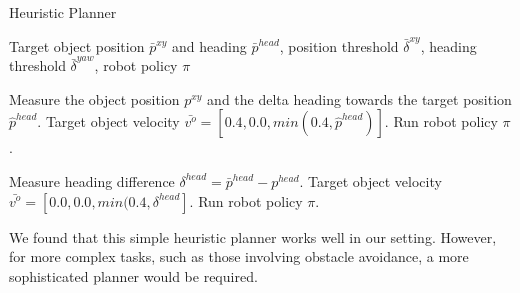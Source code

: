 \begin{algorithm}[htbp]
\caption{Heuristic Planner}
\label{alg:heurisitc_planner}
    \begin{algorithmic}[1]{
        \footnotesize
        \Require Target object position $\bar{p}^{xy}$ and heading $\bar{p}^{head}$, position threshold $\bar{\delta}^{xy}$, heading threshold $\bar{\delta}^{yaw}$, robot policy $\pi$
        \item[]
            
        \Repeat
            \State Measure the object position $p^{xy}$ and the delta heading towards the target position $\hat{p}^{head}$.
            \State Target object velocity $\bar{v^{o}}=[0.4,0.0, min(0.4,\hat{p}^{head})] $.
            \State Run robot policy $\pi$.
            
        \item[]
      	\Repeat
             \State Measure heading difference $\delta^{head} = \bar{p}^{head} - p^{head}$.
            \State Target object velocity $\bar{v^{o}}=[0.0,0.0, min(0.4,\delta^{head}]$.
            \State Run robot policy $\pi$.
            }
  \end{algorithmic}
\end{algorithm}


We found that this simple heuristic planner works well in our setting. However, for more complex tasks, such as those involving obstacle avoidance, a more sophisticated planner would be required.



